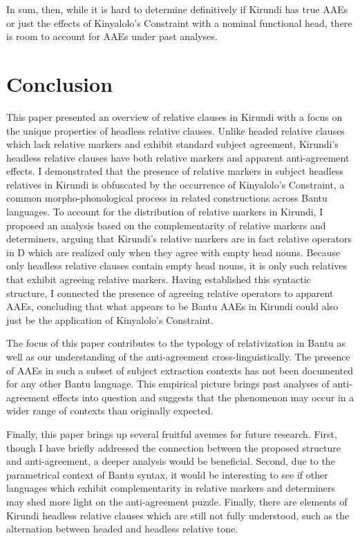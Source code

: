 \documentclass[output=paper,colorlinks,citecolor=brown
]{langscibook}
\begin{document}
In sum, then, while it is hard to determine definitively if Kirundi has true AAEs or just the effects of Kinyalolo's Constraint with a nominal functional head, there is room to account for AAEs under past analyses.

\section{Conclusion} \label{sec:myers:conclusion}

This paper presented an overview of relative clauses in Kirundi with a focus on the unique properties of headless relative clauses. Unlike headed relative clauses which lack relative markers and exhibit standard subject agreement, Kirundi's headless relative clauses have both relative markers and apparent anti-agreement effects. I demonstrated that the presence of relative markers in subject headless relatives in Kirundi is obfuscated by the occurrence of Kinyalolo's Constraint, a common morpho-phonological process in related constructions across Bantu languages. To account for the distribution of relative markers in Kirundi, I proposed an analysis based on the complementarity of relative markers and determiners, arguing that Kirundi's relative markers are in fact relative operators in D which are realized only when they agree with empty head nouns. Because only headless relative clauses contain empty head nouns, it is only such relatives that exhibit agreeing relative markers. Having established this syntactic structure, I connected the presence of agreeing relative operators to apparent AAEs, concluding that what appears to be Bantu AAEs in Kirundi could also just be the application of Kinyalolo's Constraint. 

The focus of this paper contributes to the typology of relativization in Bantu as well as our understanding of the anti-agreement cross-linguistically. The presence of AAEs in such a subset of subject extraction contexts has not been documented for any other Bantu language. This empirical picture brings past analyses of anti-agreement effects into question and suggests that the phenomenon may occur in a  wider range of contexts than originally expected.

Finally, this paper brings up several fruitful avenues for future research. First, though I have briefly addressed the connection between the proposed structure and anti-agreement, a deeper analysis would be beneficial. Second, due to the parametrical context of Bantu syntax, it would be interesting to see if other languages which exhibit complementarity in relative markers and determiners may shed more light on the anti-agreement puzzle. Finally, there are elements of Kirundi headless relative clauses which are still not fully understood, such as the alternation between headed and headless relative tone.
\end{document}
